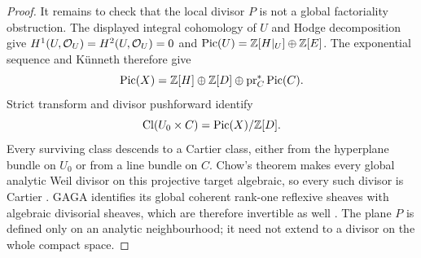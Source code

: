 \begin{proof}
It remains to check that the local divisor $P$ is not a global
factoriality obstruction.  The displayed integral cohomology of $U$ and
Hodge decomposition give $H^1(U,\mathcal O_U)=H^2(U,\mathcal O_U)=0$ and
$\operatorname{Pic}(U)=\mathbb Z[H|_U]\oplus\mathbb Z[E]$.
The exponential sequence and Künneth therefore give
\[
 \operatorname{Pic}(X)=\mathbb Z[H]\oplus\mathbb Z[D]\oplus\operatorname{pr}_C^*\operatorname{Pic}(C).
\]
Strict transform and divisor pushforward identify
\[
 \operatorname{Cl}(U_0\times C)=\operatorname{Pic}(X)/\mathbb Z[D].
\]
Every surviving class descends to a Cartier class, either from the
hyperplane bundle on $U_0$ or from a line bundle on $C$.
Chow's theorem makes every global analytic Weil divisor on this projective
target algebraic, so every such divisor is Cartier
\cite[Section~4, no.~19, Proposition~13]{SerreGAGA1956}.
GAGA identifies its global coherent
rank-one reflexive sheaves with algebraic divisorial sheaves, which are
therefore invertible as well
\cite[Section~3, no.~12, Theorems~2--3]{SerreGAGA1956}. The plane $P$ is defined only on an analytic
neighbourhood; it need not extend to a divisor on the whole compact space.
\end{proof}
